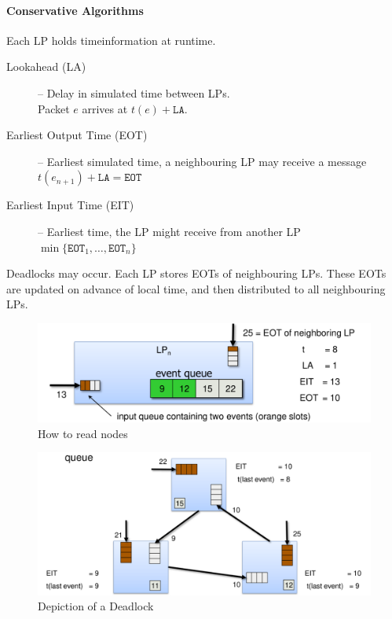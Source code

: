 \documentclass[english]{panikzettel}
\begin{document}
	\paragraph{Conservative Algorithms}
	\label{pgf:synchronization-and-coordination-algorithms:conservative-algorithms}
	
	Each LP holds timeinformation at runtime.

	\begin{description}
		\item[Lookahead (LA)] – Delay in simulated time between LPs.\\
			Packet \( e \) arrives at \( t(e) + \texttt{LA} \).
		\item[Earliest Output Time (EOT)] – Earliest simulated time, a neighbouring LP may receive a message \\ 
			\( t(e_{n+1}) + \texttt{LA} =  \texttt{EOT} \) 
		\item[Earliest Input Time (EIT)] – Earliest time, the LP might receive from another LP\\
			\( \min\{\texttt{EOT}_1,\dots, \texttt{EOT}_n\} \)
	\end{description}

	Deadlocks may occur. 
	Each LP stores EOTs of neighbouring LPs.
	These EOTs are updated on advance of local time, and then distributed to all neighbouring LPs.

	\begin{halfboxl}
		\begin{figure}[H]
			\centering
			\includegraphics[width=\textwidth]{img/5-cons-nodes-legend.png}
			\caption{How to read nodes}
			\label{img-5-cons-nodes-legend}
		\end{figure}
	\end{halfboxl}%
	\begin{halfboxr}
		\vspace{-\baselineskip}
		\begin{figure}[H]
			\centering
			\includegraphics[width=\textwidth]{img/5-cons-deadlock.png}
			\caption{Depiction of a Deadlock}
			\label{img-5-cons-deadlock}
		\end{figure}
	\end{halfboxr}
\end{document}
